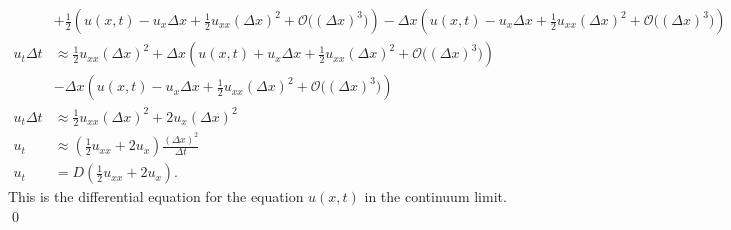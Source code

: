 \documentclass[10pt]{amsart}
\theoremstyle{nonumberplain}
\begin{document}
\begin{enumerate}[label={\bf {\arabic*}:}]
\begin{align*}
	& + \frac 1 2 \left( u(x, t) - u_x \Delta x + \frac 1 2 u_{xx} (\Delta x)^2 + \mathcal O\big((\Delta x)^3\big) \right) - \Delta x \left( u(x, t) - u_x \Delta x + \frac 1 2 u_{xx} (\Delta x)^2 + \mathcal O\big((\Delta x)^3\big) \right) \\
u_t \Delta t &\approx \frac 1 2 u_{xx} (\Delta x)^2 + \Delta x \left( u(x, t) + u_x \Delta x + \frac 1 2 u_{xx} (\Delta x)^2 + \mathcal O\big((\Delta x)^3\big)\right) \\
	& - \Delta x \left( u(x, t) - u_x \Delta x + \frac 1 2 u_{xx} (\Delta x)^2 + \mathcal O\big((\Delta x)^3\big) \right) \\
u_t \Delta t &\approx \frac 1 2 u_{xx} (\Delta x)^2 + 2 u_x (\Delta x)^2 \\
u_t &\approx \left( \frac 1 2 u_{xx} + 2 u_x \right) \frac {(\Delta x)^2}{\Delta t} \\
u_t &= D \left( \frac 1 2 u_{xx} + 2 u_x \right).
\end{align*}
This is the differential equation for the equation $u(x, t)$ in the continuum limit. \\
\qed \\

\newpage


\end{enumerate}
\end{document}
